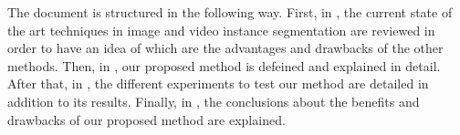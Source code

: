 The document is structured in the following way. First, in , the current state of the art techniques in image and video instance segmentation are reviewed in order to have an idea of which are the advantages and drawbacks of the other methods.
Then, in , our proposed method is defeined and explained in detail.
After that, in , the different experiments to test our method are detailed in addition to its results.
Finally, in , the conclusions about the benefits and drawbacks of our proposed method are explained.





